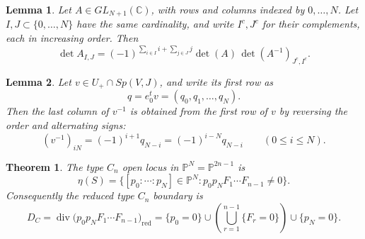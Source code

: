 \documentclass[10pt,a4paper]{amsart}
\newtheorem{thm}{Theorem}
\newtheorem{lemma}{Lemma}
\newcommand{\CC}{\mathbb{C}}
\newcommand{\PP}{\mathbb{P}}
\begin{document}
\begin{lemma}\label{lem:jacobi-complementary-minor}
Let \(A\in GL_{N+1}(\CC)\), with rows and columns indexed by \(0,\ldots,N\). Let \(I,J\subset\{0,\ldots,N\}\) have the same cardinality, and write \(I^c,J^c\) for their complements, each in increasing order. Then
\[
\det A_{I,J}
=
(-1)^{\sum_{i\in I}i+\sum_{j\in J}j}
\det(A)\,
\det (A^{-1})_{J^c,I^c}.
\]
\end{lemma}

\begin{lemma}\label{lem:symplectic-inverse-last-column}
Let \(v\in U_+\cap Sp(V,J)\), and write its first row as
\[
q=e_0^tv=(q_0,q_1,\ldots,q_N).
\]
Then the last column of \(v^{-1}\) is obtained from the first row of \(v\) by reversing the order and alternating signs:
\[
(v^{-1})_{iN}=(-1)^{i+1}q_{N-i}=(-1)^{i-N}q_{N-i}
\qquad(0\le i\le N).
\]
\end{lemma}

\begin{thm}\label{thm:richardson-boundary}
The type \(C_n\) open locus in \(\PP^N=\PP^{2n-1}\) is
\[
\eta(S)=
\{[p_0:\cdots:p_N]\in \PP^N:
 p_0p_NF_1\cdots F_{n-1}\ne0\}.
\]
Consequently the reduced type \(C_n\) boundary is
\[
D_C
=
\operatorname{div}\bigl(p_0p_NF_1\cdots F_{n-1}\bigr)_{\mathrm{red}}
=
\{p_0=0\}
\cup
\left(\bigcup_{r=1}^{n-1}\{F_r=0\}\right)
\cup
\{p_N=0\}.
\]
\end{thm}
\end{document}
